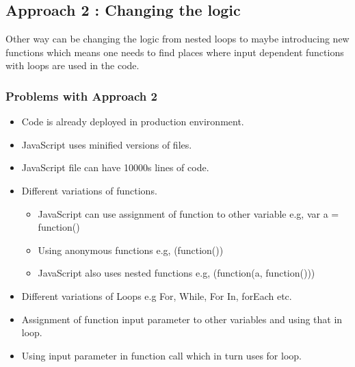 \documentclass[authoryear,preprint]{sigplanconf}
\begin{document}
\subsection{Approach 2 : Changing the logic} 
Other way can be changing the logic from nested loops to maybe introducing new functions which means one needs to find places where input dependent functions with loops are used in the code.
\subsubsection{Problems with Approach 2}
\begin{itemize}
\item Code is already deployed in production environment.
\item JavaScript uses minified versions of files.
\item JavaScript file can have 10000s lines of code.
\item Different variations of functions.
		\begin{itemize}
			\item JavaScript can use assignment of function to other variable 
				e.g, var a = function() {}
			\item Using anonymous functions
				e.g, (function())
			\item JavaScript also uses nested functions
				e.g, (function(a, function(){}))
		\end{itemize}
\item Different variations of Loops
	 e.g  For, While, For In, forEach etc.
\item Assignment of function input parameter to other variables and using that in loop.
\item Using input parameter in function call which in turn uses for loop.
	 
			
\end{itemize}




\citep{Aho86-Compilers}

\end{document}
